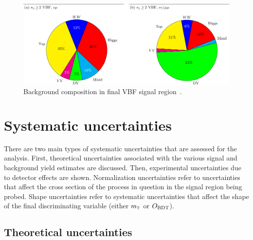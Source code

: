 \begin{figure}[h!]
  \centering
  \captionsetup{justification=centering}
  \includegraphics[width=\textwidth]{figures/VBF_bkg_comp}
  \caption{Background composition in final VBF signal region~\cite{WW2015}.}
  \label{fig:VBF_bkg_comp}
\end{figure}

\section{Systematic uncertainties}

There are two main types of systematic uncertainties that are assessed for the analysis. First, theoretical uncertainties associated with the various signal and background yield estimates are discussed. Then, experimental uncertainties due to detector effects are shown. Normalization uncertainties refer to uncertainties that affect the cross section of the process in question in the signal region being probed. Shape uncertainties refer to systematic uncertainties that affect the shape of the final discriminating variable (either $m_{\textrm{\footnotesize\sc t}}$ or $O_{\rm BDT}$). 

\subsection{Theoretical uncertainties}
\label{sec:theory_uncert_WW}

